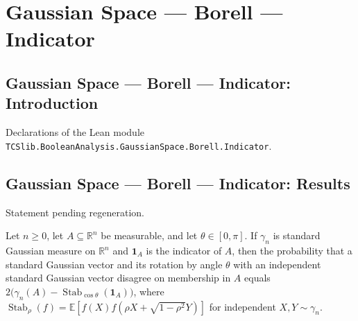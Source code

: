\section{Gaussian Space --- Borell --- Indicator}
\subsection*{Gaussian Space --- Borell --- Indicator: Introduction}

Declarations of the Lean module \texttt{TCSlib.BooleanAnalysis.GaussianSpace.Borell.Indicator}.

\subsection*{Gaussian Space --- Borell --- Indicator: Results}

\begin{lemma}
\label{BooleanAnalysis.GaussianSpace.gaussianNoiseStability_indicator_measure}
\leanok
{}
Statement pending regeneration.
\end{lemma}

\begin{lemma}
\label{BooleanAnalysis.GaussianSpace.rotationSensitivity_eq_stability}
\leanok
{}
Let $n\ge 0$, let $A\subseteq\mathbb R^n$ be measurable, and let $\theta\in[0,\pi]$. If
$\gamma_n$ is standard Gaussian measure on $\mathbb R^n$ and $\mathbf 1_A$ is the
indicator of $A$, then the probability that a standard Gaussian vector and its rotation
by angle $\theta$ with an independent standard Gaussian vector disagree on membership in
$A$ equals $2\bigl(\gamma_n(A)-\operatorname{Stab}_{\cos\theta}(\mathbf 1_A)\bigr)$,
where $\operatorname{Stab}_{\rho}(f)=\mathbb E[f(X)f(\rho X+\sqrt{1-\rho^2}Y)]$ for
independent $X,Y\sim\gamma_n$.
\end{lemma}
